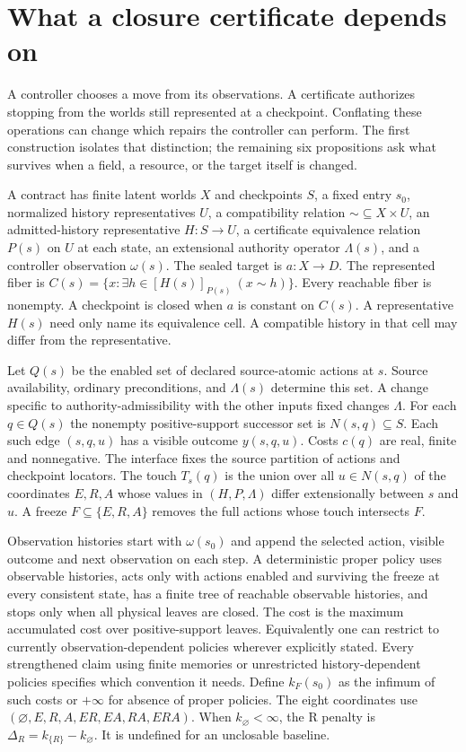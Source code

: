 \section{What a closure certificate depends on}\label{app:foundations}

A controller chooses a move from its observations. A certificate authorizes stopping from the worlds still represented at a checkpoint. Conflating these operations can change which repairs the controller can perform. The first construction isolates that distinction; the remaining six propositions ask what survives when a field, a resource, or the target itself is changed.

A contract has finite latent worlds \(X\) and checkpoints \(S\), a fixed entry \(s_0\), normalized history representatives \(U\), a compatibility relation \(\sim\subseteq X\times U\), an admitted-history representative \(H:S\to U\), a certificate equivalence relation \(P(s)\) on \(U\) at each state, an extensional authority operator \(\Lambda(s)\), and a controller observation \(\omega(s)\). The sealed target is \(a:X\to D\). The represented fiber is \(C(s)=\{x:\exists h\in [H(s)]_{P(s)}\ (x\sim h)\}\). Every reachable fiber is nonempty. A checkpoint is closed when \(a\) is constant on \(C(s)\). A representative \(H(s)\) need only name its equivalence cell. A compatible history in that cell may differ from the representative.

Let \(Q(s)\) be the enabled set of declared source-atomic actions at \(s\). Source availability, ordinary preconditions, and \(\Lambda(s)\) determine this set. A change specific to authority-admissibility with the other inputs fixed changes \(\Lambda\). For each \(q\in Q(s)\) the nonempty positive-support successor set is \(N(s,q)\subseteq S\). Each such edge \((s,q,u)\) has a visible outcome \(y(s,q,u)\). Costs \(c(q)\) are real, finite and nonnegative. The interface fixes the source partition of actions and checkpoint locators. The touch \(T_s(q)\) is the union over all \(u\in N(s,q)\) of the coordinates \(E,R,A\) whose values in \((H,P,\Lambda)\) differ extensionally between \(s\) and \(u\). A freeze \(F\subseteq\{E,R,A\}\) removes the full actions whose touch intersects \(F\).

Observation histories start with \(\omega(s_0)\) and append the selected action, visible outcome and next observation on each step. A deterministic proper policy uses observable histories, acts only with actions enabled and surviving the freeze at every consistent state, has a finite tree of reachable observable histories, and stops only when all physical leaves are closed. The cost is the maximum accumulated cost over positive-support leaves. Equivalently one can restrict to currently observation-dependent policies wherever explicitly stated. Every strengthened claim using finite memories or unrestricted history-dependent policies specifies which convention it needs. Define \(k_F(s_0)\) as the infimum of such costs or \(+\infty\) for absence of proper policies. The eight coordinates use \((\varnothing,E,R,A,ER,EA,RA,ERA)\). When \(k_{\varnothing}<\infty\), the R penalty is \(\Delta_R=k_{\{R\}}-k_{\varnothing}\). It is undefined for an unclosable baseline.

